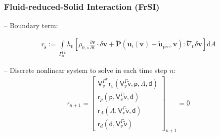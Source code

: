 \documentclass[a4paper,12pt]{report}
\newcommand{\fSr}{\tilde{\text{s}}}
\newcommand{\fF}{\text{f}}
\newcommand{\bs}[1]{\boldsymbol{#1}}
\newcommand{\Gm}{\mathit{\Gamma}}
\newcommand{\ROP}{\bs{\mathsf{r}}}
\newcommand{\LMZ}{\bs{\mathsf{\Lambda}}}
\begin{document}
\begin{equation}
\begin{aligned}
\end{aligned}
\end{equation}


\subsubsection{Fluid-reduced-Solid Interaction (FrSI)}\label{fluid-reduced-solid-interaction-frsi}

-- Boundary term:

\begin{align}
	r_{\fSr} := \int\limits_{\Gm_{0}^{\fF\text{-}\fSr}} h_{0} \left[\rho_{0,s}\frac{\partial\boldsymbol{v}}{\partial t}\cdot\delta\boldsymbol{v} + \tilde{\boldsymbol{P}}(\boldsymbol{u}_{\fF}(\boldsymbol{v}) + \tilde{\boldsymbol{u}}_{\mathrm{pre}},\boldsymbol{v}) : \tilde{\nabla}_{0}\delta\boldsymbol{v}\right]\mathrm{d}A
\end{align}


-- Discrete nonlinear system to solve in each time step $n$:
\begin{equation}
\label{equation-nonlin-sys-frsi-0d}
\begin{aligned}
\ROP_{n+1} = \begin{bmatrix} \boldsymbol{\mathsf{V}}_{v}^{\Gm^\mathrm{T}}\ROP_{v}(\boldsymbol{\mathsf{V}}_{v}^{\Gm}\tilde{\boldsymbol{\mathsf{v}}},\boldsymbol{\mathsf{p}},\LMZ,\boldsymbol{\mathsf{d}}) \\ \ROP_{p}(\boldsymbol{\mathsf{p}},\boldsymbol{\mathsf{V}}_{v}^{\Gm}\tilde{\boldsymbol{\mathsf{v}}},\boldsymbol{\mathsf{d}}) \\ \ROP_{\mathit{\Lambda}}(\LMZ,\boldsymbol{\mathsf{V}}_{v}^{\Gm}\tilde{\boldsymbol{\mathsf{v}}},\boldsymbol{\mathsf{d}}) \\ \ROP_{d}(\boldsymbol{\mathsf{d}},\boldsymbol{\mathsf{V}}_{v}^{\Gm}\tilde{\boldsymbol{\mathsf{v}}}) \end{bmatrix}_{n+1} = \boldsymbol{\mathsf{0}}
\end{aligned}
\end{equation}
\end{document}
